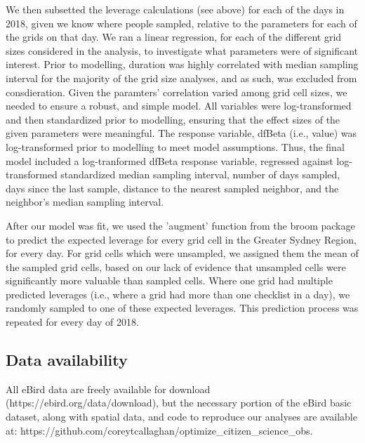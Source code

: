 \documentclass[9pt,twocolumn,twoside,lineno]{pnas-new}
\begin{document}
{We then subsetted the leverage calculations (see above) for each of the days in 2018, given we know where people sampled, relative to the parameters for each of the grids on that day. We ran a linear regression, for each of the different grid sizes considered in the analysis, to investigate what parameters were of significant interest. Prior to modelling, duration was highly correlated with median sampling interval for the majority of the grid size analyses, and as such, was excluded from consdieration. Given the paramters' correlation varied among grid cell sizes, we needed to ensure a robust, and simple model. All variables were log-transformed and then standardized prior to modelling, ensuring that the effect sizes of the given parameters were meaningful. The response variable, dfBeta (i.e., value) was log-transformed prior to modelling to meet model assumptions. Thus, the final model included a log-tranformed dfBeta response variable, regressed against log-transformed standardized median sampling interval, number of days sampled, days since the last sample, distance to the nearest sampled neighbor, and the neighbor's median sampling interval.

After our model was fit, we used the 'augment' function from the broom package \cite{robinson2018broom} to predict the expected leverage for every grid cell in the Greater Sydney Region, for every day. For grid cells which were unsampled, we assigned them the mean of the sampled grid cells, based on our lack of evidence that unsampled cells were significantly more valuable than sampled cells. Where one grid had multiple predicted leverages (i.e., where a grid had more than one checklist in a day), we randomly sampled to one of these expected leverages. This prediction process was repeated for every day of 2018.

\subsection*{Data availability} All eBird data are freely available for download (https://ebird.org/data/download), but the necessary portion of the eBird basic dataset, along with spatial data, and code to reproduce our analyses are available at: https://github.com/coreytcallaghan/optimize_citizen_science_obs.
}

\showmatmethods{} %


\showacknow{} %


\end{document}

